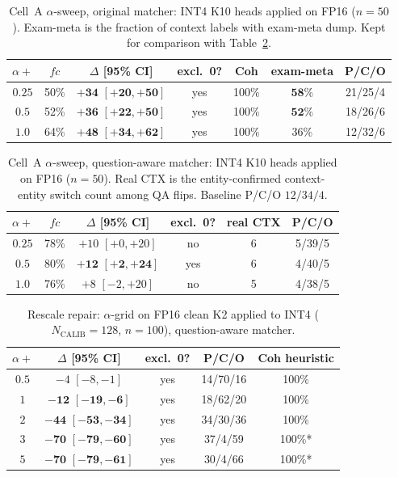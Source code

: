 \documentclass{article} %
\begin{document}
\begin{table}[h]
\caption{Cell~A $\alpha$-sweep, original matcher: INT4 K10 heads applied on FP16 ($n{=}50$). Exam-meta is the fraction of context labels with exam-meta dump. Kept for comparison with Table~\ref{tab:cell-a-alpha-qa}.}
\label{tab:cell-a-alpha}
\centering\small
\begin{tabular}{ccccccc}
\toprule
$\alpha{+}$ & $fc$ & $\Delta$ [95\% CI] & excl.\ 0? & Coh & exam-meta & P/C/O \\
\midrule
$0.25$ & 50\% & $\mathbf{+34}$ $\mathbf{[+20,+50]}$ & yes & 100\% & $\mathbf{58\%}$ & 21/25/4 \\
$0.5$ & 52\% & $\mathbf{+36}$ $\mathbf{[+22,+50]}$ & yes & 100\% & $\mathbf{52\%}$ & 18/26/6 \\
$1.0$ & 64\% & $\mathbf{+48}$ $\mathbf{[+34,+62]}$ & yes & 100\% & 36\% & 12/32/6 \\
\bottomrule
\end{tabular}
\end{table}

\begin{table}[h]
\caption{Cell~A $\alpha$-sweep, question-aware matcher: INT4 K10 heads applied on FP16 ($n{=}50$). Real CTX is the entity-confirmed context-entity switch count among QA flips. Baseline P/C/O $12/34/4$.}
\label{tab:cell-a-alpha-qa}
\centering\small
\begin{tabular}{cccccc}
\toprule
$\alpha{+}$ & $fc$ & $\Delta$ [95\% CI] & excl.\ 0? & real CTX & P/C/O \\
\midrule
$0.25$ & 78\% & $+10$ $[+0,+20]$ & no & 6 & 5/39/5 \\
$0.5$ & 80\% & $\mathbf{+12}$ $\mathbf{[+2,+24]}$ & yes & 6 & 4/40/5 \\
$1.0$ & 76\% & $+8$ $[-2,+20]$ & no & 5 & 4/38/5 \\
\bottomrule
\end{tabular}
\end{table}

\begin{table}[h]
\caption{Rescale repair: $\alpha$-grid on FP16 clean K2 applied to INT4 ($N_{\mathrm{CALIB}}{=}128$, $n{=}100$), question-aware matcher.}
\label{tab:alpha-grid}
\centering\small
\begin{tabular}{ccccc}
\toprule
$\alpha{+}$ & $\Delta$ [95\% CI] & excl.\ 0? & P/C/O & Coh heuristic \\
\midrule
$0.5$ & $-4$ $[-8,-1]$ & yes & 14/70/16 & 100\% \\
$1$ & $\mathbf{-12}$ $\mathbf{[-19,-6]}$ & yes & 18/62/20 & 100\% \\
$2$ & $\mathbf{-44}$ $\mathbf{[-53,-34]}$ & yes & 34/30/36 & 100\% \\
$3$ & $\mathbf{-70}$ $\mathbf{[-79,-60]}$ & yes & 37/4/59 & 100\%* \\
$5$ & $\mathbf{-70}$ $\mathbf{[-79,-61]}$ & yes & 30/4/66 & 100\%* \\
\bottomrule
\end{tabular}
\end{table}
\end{document}
